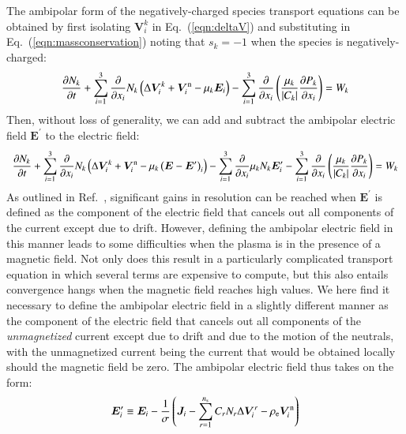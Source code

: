 \documentclass[twoside,onecolumn,10pt]{waflarticle}
\renewcommand{\vec}[1]{\bm{#1}}
\newcommand{\mfd}{\displaystyle}
\newcommand{\ns}{{n_{\rm s}}}
\renewcommand{\vec}[1]{\bm{ #1 }}
\begin{document}
The ambipolar form of the negatively-charged species transport equations can be obtained by first isolating $\vec{V}_i^k$ in  Eq.\ (\ref{eqn:deltaV}) and substituting in Eq.\ (\ref{eqn:massconservation}) noting that $s_k=-1$ when the species is negatively-charged:
%
\begin{equation}
\begin{array}{l}\mfd
  \frac{\partial N_k}{\partial t} 
+ \sum_{i=1}^3 \frac{\partial}{\partial x_i}  N_k \left(  \Delta \vec{V}_i^k +\vec{V}^{\rm n}_i - \mu_k  \vec{E}_i
\right) 
- \sum_{i=1}^3  \frac{\partial}{\partial x_i}  \left( 
   \frac{\mu_k }{|C_k|} \frac{\partial P_k}{\partial x_i}
\right) 
= W_k
\end{array}
\end{equation}
%
Then, without loss of generality, we can add and subtract the ambipolar electric field $\vec{E}^\prime$ to the electric field:
%
\begin{equation}
\begin{array}{l}\mfd
  \frac{\partial N_k}{\partial t} 
+ \sum_{i=1}^3 \frac{\partial}{\partial x_i}  N_k \left(  \Delta \vec{V}_i^k +\vec{V}^{\rm n}_i - \mu_k  \left(\vec{E} -\vec{E}^\prime  \right)_i
\right) 
- \sum_{i=1}^3  \frac{\partial}{\partial x_i}  \mu_k N_k \vec{E}^\prime_i 
- \sum_{i=1}^3  \frac{\partial}{\partial x_i}  \left( 
   \frac{\mu_k }{|C_k|} \frac{\partial P_k}{\partial x_i}
\right) 
= W_k
\end{array}
\label{eqn:negspecies1}
\end{equation}
%
As outlined in Ref.\ \cite{jcp:2014:parent}, significant gains in resolution can be reached when $\vec{E}^\prime$ is defined as the component of the electric field that cancels out all components of the current except due to drift. However, defining the ambipolar electric field  in this manner leads to some difficulties when the plasma is in the presence of a magnetic field. Not only does this result in a particularly complicated transport equation in which several terms are expensive to compute, but this  also entails convergence hangs when the magnetic field reaches high values. We here find it necessary to define the ambipolar electric field in a slightly different manner as the component of the electric field that cancels out all components of the \emph{unmagnetized} current except due to drift and due to the motion of the neutrals, with the unmagnetized current being the current that would be obtained locally should the magnetic field be zero. The ambipolar electric field thus takes on the form:
%
\begin{equation}
 \vec{E}_i^\prime \equiv \vec{E}_i - \frac{1}{\sigma} \left(\vec{J}_i-\sum_{r=1}^\ns C_r N_r \Delta \vec{V}_i^r -\rho_{\rm e} \vec{V}_i^{\rm n} \right)
 \label{eqn:Eprimedefinition}
\end{equation}
\end{document}
